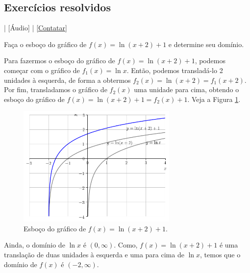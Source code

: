 \subsection*{Exercícios resolvidos}

\begin{flushright}
  [Vídeo] | [Áudio] | \href{https://phkonzen.github.io/notas/contato.html}{[Contatar]}
\end{flushright}

\begin{exeresol}
  Faça o esboço do gráfico de $f(x) = \ln(x+2)+1$ e determine seu domínio.
\end{exeresol}
\begin{resol}
  Para fazermos o esboço do gráfico de $f(x) = \ln(x+2)+1$, podemos começar com o gráfico de $f_1(x) = \ln x$. Então, podemos transladá-lo 2 unidades à esquerda, de forma a obtermos $f_2(x) = \ln(x+2) = f_1(x+2)$. Por fim, transladamos o gráfico de $f_2(x)$ uma unidade para cima, obtendo o esboço do gráfico de $f(x) = \ln(x+2)+1=f_2(x)+1$. Veja a Figura \ref{fig:exeresol_lograf}.

  \begin{figure}[H]
    \centering
    \includegraphics[width=0.7\textwidth]{./cap_funcao/dados/fig_exeresol_lograf/fig_exeresol_lograf}
    \caption{Esboço do gráfico de $f(x) = \ln(x+2)+1$.}
    \label{fig:exeresol_lograf}
  \end{figure}

Ainda, o domínio de $\ln x$ é $(0, \infty)$. Como, $f(x) = \ln(x+2)+1$ é uma translação de duas unidades à esquerda e uma para cima de $\ln x$, temos que o domínio de $f(x)$ é $(-2, \infty)$.
\end{resol}

